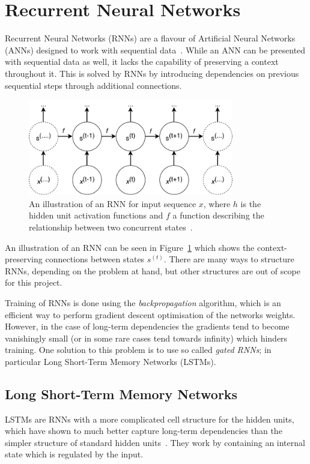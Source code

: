 \section{Recurrent Neural Networks}
Recurrent Neural Networks (RNNs) are a flavour of Artificial Neural Networks (ANNs) designed to work with sequential data~\cite{goodfellow2016deep}. While an ANN can be presented with sequential data as well, it lacks the capability of preserving a context throughout it. This is solved by RNNs by introducing dependencies on previous sequential steps through additional connections.
\begin{figure}[H]
  \centering
  \includegraphics[width=0.8\textwidth]{graphics/rnn}
  \caption{An illustration of an RNN for input sequence $x$, where $h$ is the hidden unit activation functions and $f$ a function describing the relationship between two concurrent states~\cite{goodfellow2016deep}.}\label{fig:rnn}
\end{figure}
An illustration of an RNN can be seen in Figure~\ref{fig:rnn} which shows the context-preserving connections between states $s^{(t)}$. There are many ways to structure RNNs, depending on the problem at hand, but other structures are out of scope for this project.

Training of RNNs is done using the \textit{backpropagation} algorithm, which is an efficient way to perform gradient descent optimisation of the networks weights. However, in the case of long-term dependencies the gradients tend to become vanishingly small (or in some rare cases tend towards infinity) which hinders training. One solution to this problem is to use so called \textit{gated RNNs}; in particular Long Short-Term Memory Networks (LSTMs).

\subsection{Long Short-Term Memory Networks}
LSTMs are RNNs with a more complicated cell structure for the hidden units, which have shown to much better capture long-term dependencies than the simpler structure of standard hidden units~\cite{hochreiter1997long}. They work by containing an internal state which is regulated by the input.

